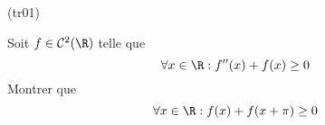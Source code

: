 \begin{tiny}(tr01)\end{tiny}
Soit $f\in \mathcal C^2(\R)$ telle que
\begin{displaymath}
 \forall x \in \R : f''(x)+f(x)\geq 0
\end{displaymath}
Montrer que
\begin{displaymath}
 \forall x \in \R : f(x)+f(x+\pi)\geq 0
\end{displaymath}
 